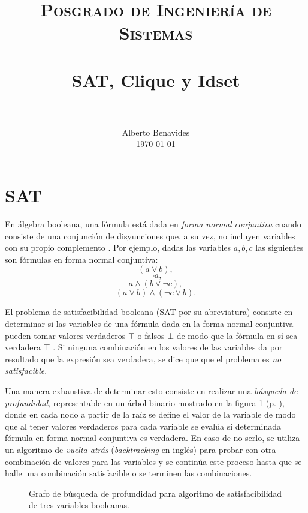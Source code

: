 \documentclass[paper=leter, fontsize=11pt]{scrartcl}
\title{
		\usefont{OT1}{bch}{b}{n}
		\normalfont \normalsize \textsc{Posgrado de Ingeniería de Sistemas} \\ [25pt]
		\horrule{0.5pt} \\[0.4cm]
		\huge SAT, Clique y Idset \\
		\horrule{2pt} \\[0.5cm]
}
\author{
		\normalfont 								\normalsize
        Alberto Benavides\\[-3pt]		\normalsize
        \today
}
\date{}
\numberwithin{equation}{section}		%
\numberwithin{figure}{section}			%
\numberwithin{table}{section}				%
\begin{document}
\maketitle
\section{SAT}
En álgebra booleana, una fórmula está dada en \textit{forma normal conjuntiva} cuando consiste de una conjunción de disyunciones que, a su vez, no incluyen variables con su propio complemento \cite{fnc}. Por ejemplo, dadas las variables $a, b, c$ las siguientes son fórmulas en forma normal conjuntiva:
$$(a \lor b), $$
$$ \neg a, $$
$$a \land (b \lor \neg c),$$
$$(a \lor b) \land (\neg c \lor b).$$

El problema de satisfacibilidad booleana (SAT por su abreviatura) consiste en determinar si las variables de una fórmula dada en la forma normal conjuntiva pueden tomar valores verdaderos $\top$ o falsos $\bot$ de modo que la fórmula en sí sea verdadera $\top$ \cite{sat}. Si ninguna combinación en los valores de las variables da por resultado que la expresión sea verdadera, se dice que que el problema es \textit{no satisfacible}.

Una manera exhaustiva de determinar esto consiste en realizar una \textit{búsqueda de profundidad}, representable en un árbol binario mostrado en la figura \ref{profundidad} (p. \pageref{profundidad}), donde en cada nodo a partir de la raíz se define el valor de la variable de modo que al tener valores verdaderos para cada variable se evalúa si determinada fórmula en forma normal conjuntiva es verdadera. En caso de no serlo, se utiliza un algoritmo de \textit{vuelta atrás} (\textit{backtracking} en inglés) \cite{bt} para probar con otra combinación de valores para las variables y se continúa este proceso hasta que se halle una combinación satisfacible o se terminen las combinaciones.

\begin{figure}
	\centering
	\caption{Grafo de búsqueda de profundidad para algoritmo de satisfacibilidad de tres variables booleanas.}
	\label{profundidad}
\end{figure}




\end{document}
